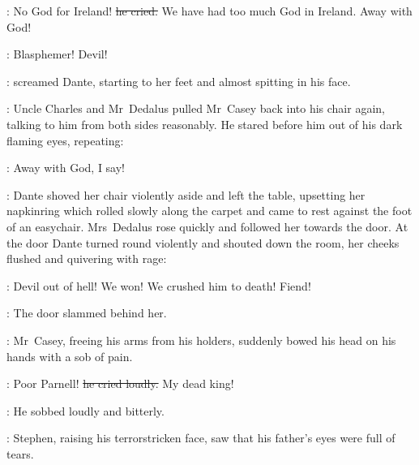 \casey:
No God for Ireland!
\sout{he cried.}
We have had too much God in Ireland.
Away with God!

\dante:
Blasphemer!
Devil!

:
screamed Dante,
starting to her feet
and almost spitting in his face.

:
Uncle Charles and Mr~Dedalus
pulled Mr~Casey back into his chair again,
talking to him from both sides reasonably.
He stared before him out of his dark flaming eyes,
repeating:

\casey:
Away with God,
I say!

:
Dante shoved her chair violently aside
and left the table,
upsetting her napkinring
which rolled slowly along the carpet
and came to rest against the foot of an easychair.
Mrs~Dedalus rose quickly and followed her towards the door.
At the door Dante turned round violently
and shouted down the room,
her cheeks flushed and quivering with rage:

\dante:
Devil out of hell!
We won!
We crushed him to death!
Fiend!

:
The door slammed behind her.

:
Mr~Casey,
freeing his arms from his holders,
suddenly bowed his head on his hands with a sob of pain.

\casey:
Poor Parnell!
\sout{he cried loudly.}
My dead king!

:
He sobbed loudly and bitterly.

:
Stephen,
raising his terrorstricken face,
saw that his father’s eyes were full of tears.


